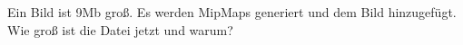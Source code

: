 \documentclass[../../main.tex]{subfiles}
\begin{document}
Ein Bild ist 9Mb groß. Es werden MipMaps generiert und dem Bild hinzugefügt. 
Wie groß ist die Datei jetzt und warum?
\end{document}
